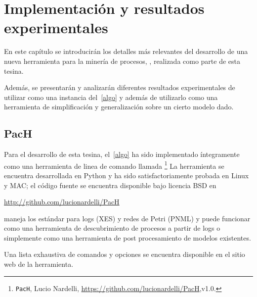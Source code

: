 \chapter[Implementación y resultados experimentales ]{Implementación y resultados experimentales}
\label{chap:4}

En este capítulo se introducirán los detalles más relevantes del desarrollo de una nueva
herramienta para la minería de procesos, \pachtool, realizada como parte de esta tesina. 

Además, se presentarán y analizarán diferentes resultados experimentales 
de utilizar \pachtool como una instancia del~\autoref{algo} y además
de utilizarlo como una herramienta de
simplificación y generalización sobre un cierto modelo dado. 

\section{PacH}
\label{sec:4.pach}

Para el desarrollo de esta tesina, el~\autoref{algo} ha sido implementado íntegramente 
como una herramienta de linea de comando llamada \pachtool\footnote{\texttt{PacH}, Lucio Nardelli, \url{https://github.com/lucionardelli/PacH},v1.0.}
La herramienta se encuentra desarrollada en Python y ha sido satisfactoriamente probada en Linux y MAC;
el código fuente se encuentra disponible bajo licencia BSD en
\begin{center}\url{http://github.com/lucionardelli/PacH}\end{center}

\pachtool maneja los estándar para logs (XES) y redes de Petri (PNML) y puede funcionar como 
una herramienta de descubrimiento de procesos a partir de logs o simplemente como una herramienta 
de post procesamiento de modelos existentes.

Una lista exhaustiva de comandos y opciones se encuentra disponible en el sitio web de la herramienta.

%

